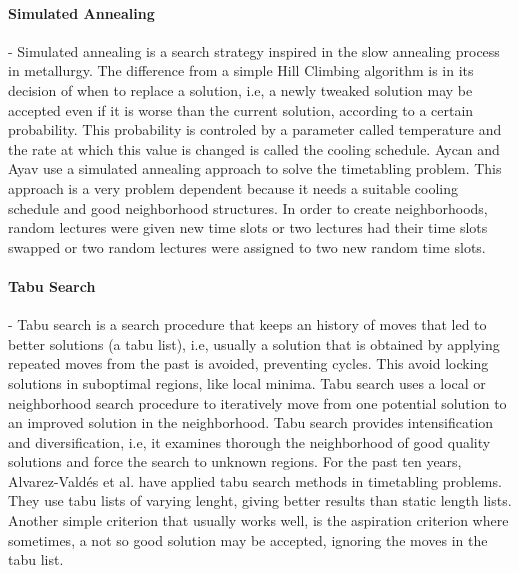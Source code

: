 \paragraph{\textbf{Simulated Annealing}} - Simulated annealing is a search strategy inspired  in the slow annealing process in metallurgy. The difference from a simple Hill Climbing algorithm is in its decision of when to replace a solution, i.e, a newly tweaked solution may be accepted even if it is worse than the current solution, according to a certain probability. This probability is controled by a parameter called temperature and the rate at which this value is changed is called the cooling schedule. Aycan and Ayav \citep{aycan2009solving} use a simulated annealing approach to solve the timetabling problem.  This approach is a very problem dependent because it needs a suitable cooling schedule and good neighborhood structures. In order to create neighborhoods, random lectures were given new time slots or two lectures had their time slots swapped or two random lectures were assigned to two new random time slots.

\paragraph{\textbf{Tabu Search}} - Tabu search is a search procedure that keeps an history of moves that led to better solutions (a tabu list), i.e, usually a solution that is obtained by applying repeated moves from the past is avoided, preventing cycles. This avoid locking solutions in suboptimal regions, like local minima. Tabu search uses a local or neighborhood search procedure to iteratively move from one potential solution to an improved solution in the neighborhood. Tabu search provides intensification and diversification, i.e, it examines thorough the neighborhood of good quality solutions and force the search to unknown regions. For the past ten years, Alvarez-Vald{\'e}s et al. \cite{alvarez2001tabu}  have applied tabu search methods in timetabling problems. They use tabu lists of varying lenght, giving better results than static length lists. Another simple criterion that usually works well, is the aspiration criterion where sometimes, a not so good solution may be accepted, ignoring the moves in the tabu list. 

